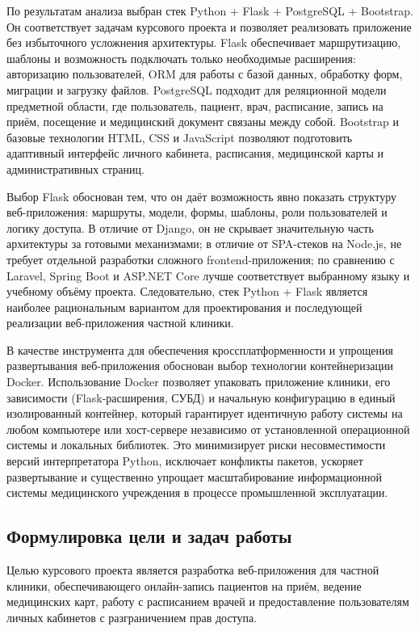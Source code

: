 По результатам анализа выбран стек Python + Flask + PostgreSQL + Bootstrap. Он соответствует задачам курсового проекта и позволяет реализовать приложение без избыточного усложнения архитектуры. Flask обеспечивает маршрутизацию, шаблоны и возможность подключать только необходимые расширения: авторизацию пользователей, ORM для работы с базой данных, обработку форм, миграции и загрузку файлов. PostgreSQL подходит для реляционной модели предметной области, где пользователь, пациент, врач, расписание, запись на приём, посещение и медицинский документ связаны между собой. Bootstrap и базовые технологии HTML, CSS и JavaScript позволяют подготовить адаптивный интерфейс личного кабинета, расписания, медицинской карты и административных страниц.

Выбор Flask обоснован тем, что он даёт возможность явно показать структуру веб-приложения: маршруты, модели, формы, шаблоны, роли пользователей и логику доступа. В отличие от Django, он не скрывает значительную часть архитектуры за готовыми механизмами; в отличие от SPA-стеков на Node.js, не требует отдельной разработки сложного frontend-приложения; по сравнению с Laravel, Spring Boot и ASP.NET Core лучше соответствует выбранному языку и учебному объёму проекта. Следовательно, стек Python + Flask является наиболее рациональным вариантом для проектирования и последующей реализации веб-приложения частной клиники.

В качестве инструмента для обеспечения кроссплатформенности и упрощения развертывания веб-приложения обоснован выбор технологии контейнеризации Docker. Использование Docker позволяет упаковать приложение клиники, его зависимости (Flask-расширения, СУБД) и начальную конфигурацию в единый изолированный контейнер, который гарантирует идентичную работу системы на любом компьютере или хост-сервере независимо от установленной операционной системы и локальных библиотек. Это минимизирует риски несовместимости версий интерпретатора Python, исключает конфликты пакетов, ускоряет развертывание и существенно упрощает масштабирование информационной системы медицинского учреждения в процессе промышленной эксплуатации.

\subsection{Формулировка цели и задач работы}

Целью курсового проекта является разработка веб-приложения для частной клиники, обеспечивающего онлайн-запись пациентов на приём, ведение медицинских карт, работу с расписанием врачей и предоставление пользователям личных кабинетов с разграничением прав доступа.

